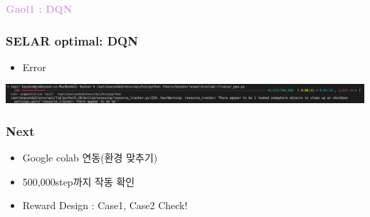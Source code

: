 \documentclass[usenames,dvipsnames, aspectratio=169, 9pt]{beamer}
\begin{document}
\begin{frame}
\centering
\textcolor{Plum}{\textbf{Gaol1 : DQN}}
\end{frame}

\begin{frame}\frametitle{SELAR optimal: DQN}
\begin{itemize}
    \item Error
\end{itemize}
\includegraphics[width=15cm]{figures/error_m.png}
\end{frame}

\begin{frame}\frametitle{Next}
\begin{itemize}
    \item Google colab 연동(환경 맞추기)
    \item 500,000step까지 작동 확인
    \item Reward Design : Case1, Case2 Check!
\end{itemize}
\end{frame}
\end{document}
